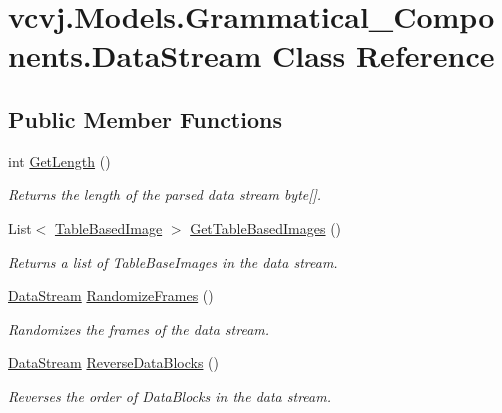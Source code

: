 \hypertarget{classvcvj_1_1_models_1_1_grammatical___components_1_1_data_stream}{}\section{vcvj.\+Models.\+Grammatical\+\_\+\+Components.\+Data\+Stream Class Reference}
\label{classvcvj_1_1_models_1_1_grammatical___components_1_1_data_stream}
\subsection*{Public Member Functions}
\begin{DoxyCompactItemize}
\item 
int \hyperlink{classvcvj_1_1_models_1_1_grammatical___components_1_1_data_stream_ad3cefa460a8e8766862279a17355b402}{Get\+Length} ()
\begin{DoxyCompactList}\small\item\em Returns the length of the parsed data stream byte\mbox{[}\mbox{]}. \end{DoxyCompactList}\item 
List$<$ \hyperlink{classvcvj_1_1_models_1_1_grammatical___components_1_1_table_based_image}{Table\+Based\+Image} $>$ \hyperlink{classvcvj_1_1_models_1_1_grammatical___components_1_1_data_stream_a0afb27b16b52529ef68cd5095e074971}{Get\+Table\+Based\+Images} ()
\begin{DoxyCompactList}\small\item\em Returns a list of Table\+Base\+Images in the data stream. \end{DoxyCompactList}\item 
\hyperlink{classvcvj_1_1_models_1_1_grammatical___components_1_1_data_stream}{Data\+Stream} \hyperlink{classvcvj_1_1_models_1_1_grammatical___components_1_1_data_stream_a7df0fc648d33803779668e00720379d6}{Randomize\+Frames} ()
\begin{DoxyCompactList}\small\item\em Randomizes the frames of the data stream. \end{DoxyCompactList}\item 
\hyperlink{classvcvj_1_1_models_1_1_grammatical___components_1_1_data_stream}{Data\+Stream} \hyperlink{classvcvj_1_1_models_1_1_grammatical___components_1_1_data_stream_a0d6571ea9e0fc3d983e003b79266130a}{Reverse\+Data\+Blocks} ()
\begin{DoxyCompactList}\small\item\em Reverses the order of Data\+Blocks in the data stream. \end{DoxyCompactList}\item 

\end{DoxyCompactItemize}
